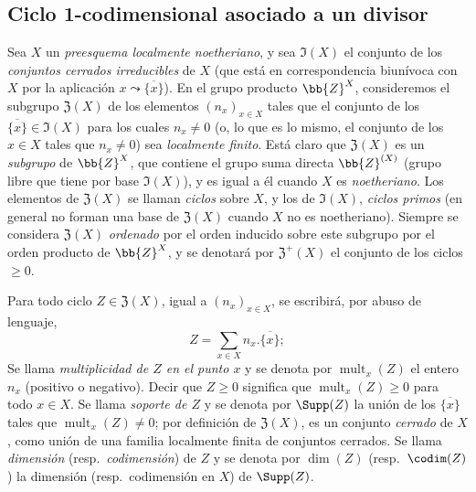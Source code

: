 \subsection{Ciclo 1-codimensional asociado a un divisor}
\label{subsection:IV.21.6}
\label{IV.21.6}

\begin{env}[21.6.1]
\label{IV.21.6.1}
Sea $X$ un \emph{preesquema localmente noetheriano}, y sea $\mathfrak{I}(X)$ el conjunto de los \emph{conjuntos cerrados irreducibles} de $X$ (que está en correspondencia biunívoca con $X$ por la aplicación $x\leadsto\overline{\{x\}}$).
En el grupo producto $\bb{Z}^X$, consideremos el subgrupo $\mathfrak{Z}(X)$ de los elementos $(n_x)_{x\in X}$ tales que el conjunto de los $\overline{\{x\}}\in\mathfrak{I}(X)$ para los cuales $n_x\neq0$ (o, lo que es 
lo mismo, el conjunto de los $x\in X$ tales que $n_x\neq0$) sea \emph{localmente finito}.
Está claro que $\mathfrak{Z}(X)$ es un \emph{subgrupo} de $\bb{Z}^X$, que contiene el grupo suma directa $\bb{Z}^{(X)}$ (grupo libre que tiene por base $\mathfrak{I}(X)$), y es igual a él cuando $X$ es \emph{noetheriano}.
Los elementos de $\mathfrak{Z}(X)$ se llaman \emph{ciclos} sobre $X$, y los de $\mathfrak{I}(X)$, \emph{ciclos primos} (en general no forman una base de $\mathfrak{Z}(X)$ cuando $X$ no es noetheriano).
Siempre se considera $\mathfrak{Z}(X)$ \emph{ordenado} por el orden inducido sobre este subgrupo por el orden producto de $\bb{Z}^X$, y se denotará por $\mathfrak{Z}^+(X)$ el conjunto de los ciclos $\geq0$.



Para todo ciclo $Z\in\mathfrak{Z}(X)$, igual a $(n_x)_{x\in X}$, se escribirá, por abuso de lenguaje,
\[
  Z=\sum_{x\in X}n_x.\overline{\{x\}};
\]
Se llama \emph{multiplicidad de $Z$ en el punto $x$} y se denota por $\operatorname{mult}_x(Z)$ el entero $n_x$ (positivo o negativo).
Decir que $Z\geq0$ significa que $\operatorname{mult}_x(Z)\geq0$ para todo $x\in X$.
Se llama \emph{soporte de $Z$} y se denota por $\Supp(Z)$ la unión de los $\overline{\{x\}}$ tales que $\operatorname{mult}_x(Z)\neq0$;
por definición de $\mathfrak{Z}(X)$, es un conjunto \emph{cerrado} de $X$, como unión de una familia localmente finita de conjuntos cerrados.
Se llama \emph{dimensión} (resp.\ \emph{codimensión}) de $Z$ y se denota por $\dim(Z)$ (resp.\ $\codim(Z)$) la dimensión (resp.\ codimensión en $X$) de $\Supp(Z)$.
\end{env}

